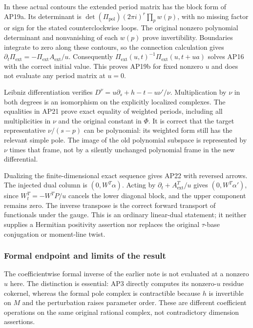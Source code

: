 \documentclass{article}
\begin{document}
In these actual contours the extended period matrix has the block form of AP19a. Its determinant is \(\det(\Pi_{\mathrm{pol}})(2\pi i)^r\prod_p w(p)\), with no missing factor or sign for the stated counterclockwise loops. The original nonzero polynomial determinant and nonvanishing of each \(w(p)\) prove invertibility. Boundaries integrate to zero along these contours, so the connection calculation gives \(\partial_t\Pi_{\mathrm{ext}}=-\Pi_{\mathrm{ext}}A_{\mathrm{ext}}/u\). Consequently \(\Pi_{\mathrm{ext}}(u,t)^{-1}\Pi_{\mathrm{ext}}(u,t+ua)\) solves AP16 with the correct initial value. This proves AP19b for fixed nonzero \(u\) and does not evaluate any period matrix at \(u=0\).

Leibniz differentiation verifies \(D^\nu=u\partial_s+h-t-u\nu'/\nu\). Multiplication by \(\nu\) in both degrees is an isomorphism on the explicitly localized complexes. The equalities in AP21 prove exact equality of weighted periods, including all multiplicities in \(\nu\) and the original constant in \(\Phi\). It is correct that the target representative \(\nu/(s-p)\) can be polynomial: its weighted form still has the relevant simple pole. The image of the old polynomial subspace is represented by \(\nu\) times that frame, not by a silently unchanged polynomial frame in the new differential.

Dualizing the finite-dimensional exact sequence gives AP22 with reversed arrows. The injected dual column is \((0,W^T\alpha)\). Acting by \(\partial_t+A_{\mathrm{ext}}^T/u\) gives \((0,W^T\alpha')\), since \(W_t^T=-W^T P/u\) cancels the lower diagonal block, and the upper component remains zero. The inverse transpose is the correct forward transport of functionals under the gauge. This is an ordinary linear-dual statement; it neither supplies a Hermitian positivity assertion nor replaces the original \(\tau\)-base conjugation or moment-line twist.

\subsubsection{Formal endpoint and limits of the result}\label{endpoint-analytic_pole_review--formal-endpoint-and-limits-of-the-result}

The coefficientwise formal inverse of the earlier note is not evaluated at a nonzero \(u\) here. The distinction is essential: AP3 directly computes its nonzero-\(u\) residue cokernel, whereas the formal pole complex is contractible because \(h\) is invertible on \(M\) and the perturbation raises parameter order. These are different coefficient operations on the same original rational complex, not contradictory dimension assertions.
\end{document}
